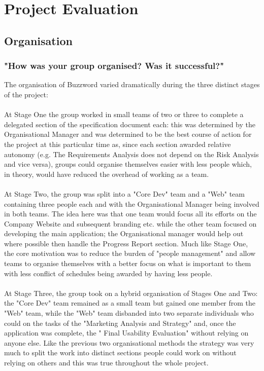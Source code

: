 \documentclass[11pt, oneside, a4paper]{report}   %
\begin{document}
\dominitoc %
\chapter{Project Evaluation} 
\pagebreak
\minitoc
\pagebreak
\section{Organisation} \label{sec:Organisation}
\subsection{"How was your group organised? Was it successful?"} \label{sec:Organisation - 1}

The organisation of Buzzword varied dramatically during the three distinct stages of the project:  \\ \\
At Stage One the group worked in small teams of two or three to complete a delegated section of the 
specification document each: this was determined by the Organisational Manager and was 
determined to be the best course of action for the project at this particular time as, since each section awarded 
relative autonomy (e.g. The Requirements Analysis does not depend on the Risk Analysis and vice versa), groups 
could organise themselves easier with less people which, in theory, would have reduced the overhead of working as a team. \\ \\
At Stage Two, the group was split into a "Core Dev" team and a "Web" team containing three people each and with the Organisational
Manager being involved in both teams. The idea here was that one team would focus all its efforts on the Company Website and subsequent 
branding etc. while the other team focused on developing the main application; the Organisational manager would help out where possible 
then handle the Progress Report section. Much like Stage One, the core motivation was to reduce the burden of "people management" and 
allow teams to organise themselves with a better focus on what is important to them with less conflict of schedules being awarded by having less
people.\\ \\
At Stage Three, the group took on a hybrid organisation of Stages One and Two: the "Core Dev" team remained as a small team but gained one
member from the "Web" team, while the "Web" team disbanded into two separate individuals who could on the tasks of the "Marketing Analysis and Strategy"
and, once the application was complete, the " Final Usability Evaluation" without relying on anyone else. Like the previous two organisational methods 
the strategy was very much to split the work into distinct sections people could work on without relying on others and this was true throughout the whole project.\\ 
\end{document}
